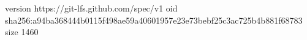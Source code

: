 version https://git-lfs.github.com/spec/v1
oid sha256:a94ba368444b0115f498ae59a40601957e23e73bebf25c3ac725b4b881f68783
size 1460
